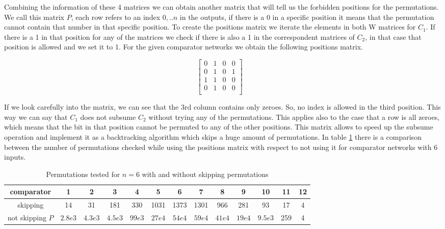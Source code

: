 \documentclass[../main.tex]{subfiles}
\begin{document}
	Combining the information of these 4 matrices we can obtain another matrix that will tell us the forbidden positions for the permutations. We call this matrix $P$, each row refers to an index $0,..n$ in the outputs, if there is a 0 in a specific position it means that the permutation cannot contain that number in that specific position. To create the positions matrix we iterate the elements in both W matrices for $C_1$. If there is a 1 in that position for any of the matrices we check if there is also a 1 in the correspondent matrices of $C_2$, in that case that position is allowed and we set it to 1. For the given comparator networks we obtain the following positions matrix.
	
	$$
	\begin{bmatrix} 
		0 & 1 & 0 & 0 \\
		0 & 1 & 0 & 1 \\
		1 & 1 & 0 & 0 \\
		0 & 1 & 0 & 0 \\
	\end{bmatrix}
	\quad
	$$
	
	If we look carefully into the matrix, we can see that the 3rd column contains only zeroes. So, no index is allowed in the third position. This way we can say that $C_1$ does not subsume $C_2$ without trying any of the permutations. This applies also to the case that a row is all zeroes, which means that the bit in that position cannot be permuted to any of the other positions. This matrix allows to speed up the subsume operation and implement it as a backtracking algorithm which skips a huge amount of permutations. In table \ref{table:compareSubsume} there is a comparison between the number of permutations checked while using the positions matrix with respect to not using it for comparator networks with 6 inputs.
	
	\begin{table}[H]
		\hspace*{-1.5cm}
		\begin{tabular}{|c |c c c c c c c c c c c c|}
			\hline
 			comparator & 1 & 2 & 3 & 4 & 5 & 6 & 7 & 8 & 9 & 10 & 11 & 12 \\
			\hline
			skipping & 14 & 31 & 181 & 330 & 1031 & 1373 & 1301 & 966 & 281 & 93 & 17 & 4 \\ [1ex]
			\hline
			not skipping $P$ & $2.8e3$ & $4.3e3$ & $4.5e3$ & $99e3$ & $27e4$ & $54e4$ & $59e4$ & $41e4$ & $19e4$ & $9.5e3$ & 259 & 4 \\  [1ex] 
			\hline
		\end{tabular}
		\caption{Permutations tested for $n=6$ with and without skipping permutations}
		\label{table:compareSubsume}
	\end{table}
\end{document}
